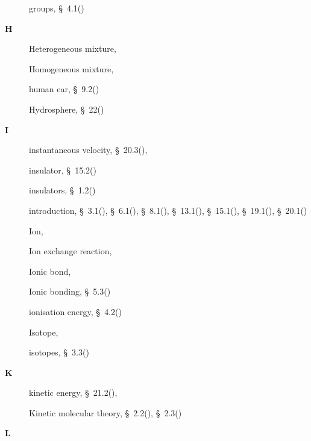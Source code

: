 \begin{multicols}{2}
{\begin{description}
	  \item[] \noindent\raggedright groups,  \S~4.1(\pageref{m38760})
	  \vspace{.3cm}
	  \item[{\large \bfseries H}]\noindent\raggedright
	  Heterogeneous mixture,  \pageref{id2405839}
	  \item[] \noindent\raggedright Homogeneous mixture,  \pageref{id2405912}
	  \item[] \noindent\raggedright human ear,  \S~9.2(\pageref{m38800})
	  \item[] \noindent\raggedright Hydrosphere,  \S~22(\pageref{m38138})
	  \vspace{.3cm}
	  \item[{\large \bfseries I}]\noindent\raggedright
	  instantaneous velocity,  \S~20.3(\pageref{m38791}),  \pageref{id2528795}
	  \item[] \noindent\raggedright insulator,  \S~15.2(\pageref{m38781})
	  \item[] \noindent\raggedright insulators,  \S~1.2(\pageref{m38706})
	  \item[] \noindent\raggedright introduction,  \S~3.1(\pageref{m38756}),  \S~6.1(\pageref{m38801}),  \S~8.1(\pageref{m38782}),  \S~13.1(\pageref{m38721}),  \S~15.1(\pageref{m38780}),  \S~19.1(\pageref{m38812}),  \S~20.1(\pageref{m38787})
	  \item[] \noindent\raggedright Ion,  \pageref{id2424842}
	  \item[] \noindent\raggedright Ion exchange reaction,  \pageref{id2492977}
	  \item[] \noindent\raggedright Ionic bond,  \pageref{id2430088}
	  \item[] \noindent\raggedright Ionic bonding,  \S~5.3(\pageref{m38684})
	  \item[] \noindent\raggedright ionisation energy,  \S~4.2(\pageref{m38757})
	  \item[] \noindent\raggedright Isotope,  \pageref{id2417667}
	  \item[] \noindent\raggedright isotopes,  \S~3.3(\pageref{m38753})
	  \vspace{.3cm}
	  \item[{\large \bfseries K}]\noindent\raggedright
	  kinetic energy,  \S~21.2(\pageref{m38785}),  \pageref{id2553759}
	  \item[] \noindent\raggedright Kinetic molecular theory,  \S~2.2(\pageref{m38734}),  \S~2.3(\pageref{m38730})
	  \vspace{.3cm}
	  \item[{\large \bfseries L}]\noindent\raggedright

\end{description}}
\end{multicols}

